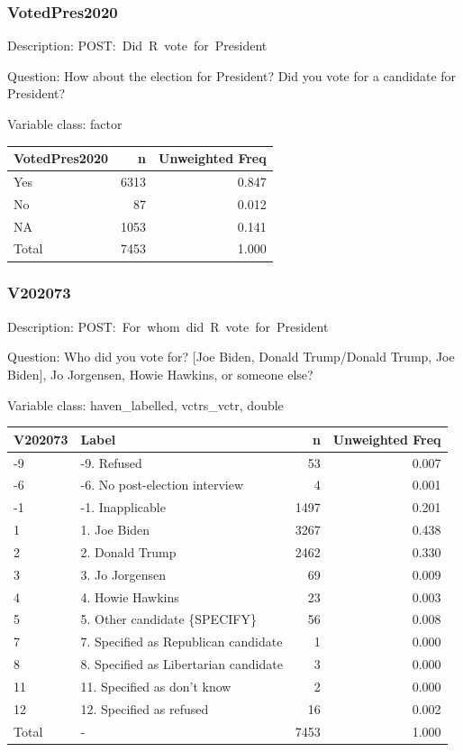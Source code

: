 \documentclass[
]{krantz}
\begin{document}
\hypertarget{votedpres2020}{%
\subsubsection*{VotedPres2020}\label{votedpres2020}}


Description: POST:~Did~R~vote~for~President

Question: How about the election for President? Did you vote for a candidate for President?

Variable class: factor

\begin{tabular}[t]{l|r|r}
\hline
VotedPres2020 & n & Unweighted Freq\\
\hline
Yes & 6313 & 0.847\\
\hline
No & 87 & 0.012\\
\hline
NA & 1053 & 0.141\\
\hline
Total & 7453 & 1.000\\
\hline
\end{tabular}

\hypertarget{v202073}{%
\subsubsection*{V202073}\label{v202073}}


Description: POST:~For~whom~did~R~vote~for~President

Question: Who did you vote for? {[}Joe Biden, Donald Trump/Donald Trump, Joe Biden{]}, Jo Jorgensen, Howie Hawkins, or someone else?

Variable class: haven\_labelled, vctrs\_vctr, double

\begin{tabular}[t]{l|l|r|r}
\hline
V202073 & Label & n & Unweighted Freq\\
\hline
-9 & -9. Refused & 53 & 0.007\\
\hline
-6 & -6. No post-election interview & 4 & 0.001\\
\hline
-1 & -1. Inapplicable & 1497 & 0.201\\
\hline
1 & 1. Joe Biden & 3267 & 0.438\\
\hline
2 & 2. Donald Trump & 2462 & 0.330\\
\hline
3 & 3. Jo Jorgensen & 69 & 0.009\\
\hline
4 & 4. Howie Hawkins & 23 & 0.003\\
\hline
5 & 5. Other candidate \{SPECIFY\} & 56 & 0.008\\
\hline
7 & 7. Specified as Republican candidate & 1 & 0.000\\
\hline
8 & 8. Specified as Libertarian candidate & 3 & 0.000\\
\hline
11 & 11. Specified as don't know & 2 & 0.000\\
\hline
12 & 12. Specified as refused & 16 & 0.002\\
\hline
Total & - & 7453 & 1.000\\
\hline
\end{tabular}
\end{document}
